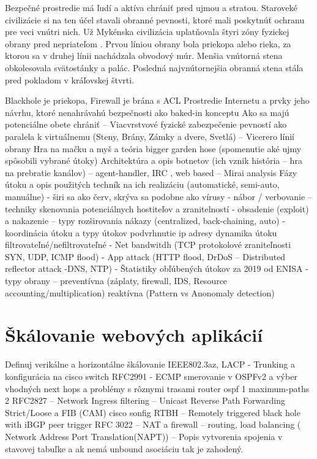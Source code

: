 \documentclass[12pt, a4paper]{article}
\begin{document}
Bezpečné prostredie má ľudí a aktíva chrániť pred ujmou a stratou. Staroveké civilizácie si na ten účel 
stavali obranné pevnosti, ktoré mali poskytnúť ochranu pre veci vnútri nich. Už Mykénska civilizácia 
uplatňovala štyri zóny fyzickej obrany pred nepriateľom \cite{physical-security}. Prvou líniou obrany
bola priekopa alebo rieka, za ktorou sa v druhej línii nachádzala obvodový múr. Menšia vnútorná stena
obkolesovala svätostánky a palác. Posledná najvnútornejšia obranná stena stála pred pokladom v kráľovskej 
štvrti. 

Blackhole je priekopa, Firewall je brána s ACL
Prostredie Internetu a prvky jeho návrhu, ktoré nenahrávahú bezpečnosti ako baked-in konceptu
Ako sa majú potenciálne obete chrániť – Viacvrstvové fyzické zabezpečenie pevností ako paralela k virtuálnemu (Steny, Brány, Zámky a dvere, Svetlá) – Vicerero línií obrany
Hra na mačku a myš a teória bigger garden hose (spomenutie aké ujmy spôsobili vybrané útoky)
Architektúra  a opis botnetov (ich vznik história – hra na prebratie kanálov) – agent-handler, IRC , web based – Mirai analysis
Fázy útoku a opis použitých techník na ich realizáciu (automatické, semi-auto, manuálne)
- širi sa ako červ, skrýva sa podobne ako vírusy
- nábor / verbovanie – techniky skenovania potenciálnych hostiteľov a zranitelností 
-  obsadenie (exploit) a nakazenie – typy rozširovania nákazy (centralized, back-chaining, auto)
-  koordinácia útoku a typy útokov
	podvrhnutie ip adresy
	dynamika útoku
	filtrovateľné/nefiltrovateľné
	- Net bandwitdh (TCP protokolové zraniteľnosti SYN, UDP, ICMP flood)
	- App attack (HTTP flood, DrDoS – Distributed reflector attack -DNS, NTP)
- Štatistiky obľúbených útokov za 2019 od ENISA
- typy obrany –
	preventívna (záplaty, firewall, IDS, Resource accounting/multiplication)
	reaktívna (Pattern vs Anonomaly detection)

\section{Škálovanie webových aplikácií}
Definuj verikálne a horizontálne škálovanie
IEEE802.3az, LACP - Trunking a konfigurácia na cisco switch
RFC2991 - ECMP smerovanie v OSPFv2 a výber vhodných next hops a problémy s rôznymi trasami
router ospf 1
maximum-paths 2
RFC2827 – Network Ingress filtering – Unicast Reverse Path Forwarding Strict/Loose a FIB (CAM)
cisco sonfig 
RTBH – Remotely triggered black hole with iBGP peer trigger
RFC 3022 – NAT a firewall – routing, load balancing ( Network Address Port Translation(NAPT)) – Popis vytvorenia spojenia v stavovej tabuľke a ak nemá unbound asociáciu tak je zahodený.
\end{document}
